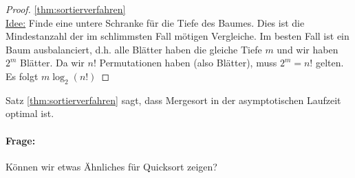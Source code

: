 \begin{proof}
\ref{thm:sortierverfahren} \\
\underline{Idee:} Finde eine untere Schranke für die Tiefe des Baumes. Dies ist die Mindestanzahl der im schlimmsten Fall mötigen Vergleiche.
Im besten Fall ist ein Baum ausbalanciert, d.h. alle Blätter haben die gleiche Tiefe $m$ und wir haben $2^{m}$ Blätter. Da wir $n!$ Permutationen haben (also Blätter), muss $2^{m}=n!$ gelten. Es folgt $m \log_2(n!)$
\end{proof}
Satz \ref{thm:sortierverfahren} sagt, dass Mergesort in der asymptotischen Laufzeit optimal ist. 
\paragraph{Frage:} Können wir etwas Ähnliches für Quicksort zeigen?

